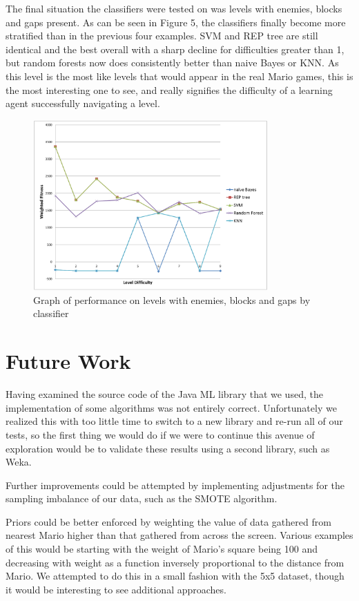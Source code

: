\documentclass[]{article}   %
\begin{document}
The final situation the classifiers were tested on was levels with enemies, blocks and gaps present. As can be seen in Figure 5, the classifiers finally become 
more stratified than in the previous four examples. SVM and REP tree are still identical and the best overall with a sharp decline for difficulties greater than 1, but 
random forests now does consistently better than naive Bayes or KNN. As this level is the most like levels that would appear in the real Mario games, this is the most
interesting one to see, and really signifies the difficulty of a learning agent successfully navigating a level.
\begin{figure}[H]
\centering
\includegraphics[width=90mm]{enemiesblocksgaps.png}
\caption{Graph of performance on levels with enemies, blocks and gaps by classifier}
\end{figure}

\section{Future Work}

Having examined the source code of the Java ML library that we used, the implementation of some algorithms was not entirely correct. Unfortunately we realized this with too
little time to switch to a new library and re-run all of our tests, so the first thing we would do if we were to continue this avenue of exploration would be to validate
these results using a second library, such as Weka.

Further improvements could be attempted by implementing adjustments for the sampling imbalance of our data, such as the SMOTE algorithm.

Priors could be better enforced by weighting the value of data gathered from nearest Mario higher than that gathered from across the screen. Various examples of this would be
starting with the weight of Mario's square being 100 and decreasing with weight as a function inversely proportional to the distance from Mario. We attempted to do this in a
small fashion with the 5x5 dataset, though it would be interesting to see additional approaches.
\end{document}
